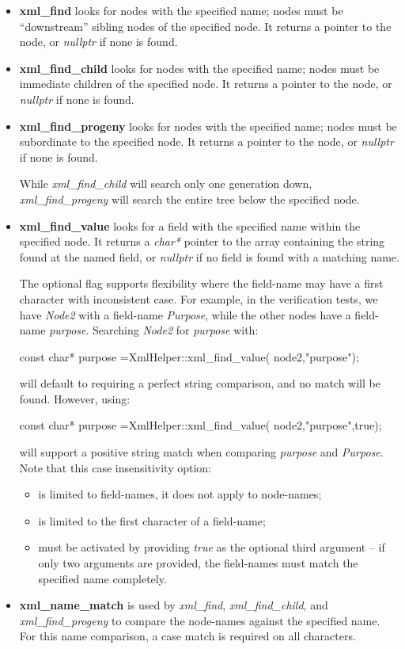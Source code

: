 \documentclass[11pt,fleqn]{report}
\begin{document}
\begin{itemize}
\item \textbf{xml\_find} looks for nodes with the specified name; nodes must
be ``downstream'' sibling nodes of the specified node.
It returns a pointer to the node, or \textit{nullptr} if none is found.
\item \textbf{xml\_find\_child} looks for nodes with the specified name;
nodes must be immediate children of the specified node.
It returns a pointer to the node, or \textit{nullptr} if none is found.
\item \textbf{xml\_find\_progeny} looks for nodes with the specified name;
nodes must be subordinate to the specified node.
It returns a pointer to the node, or \textit{nullptr} if none is found.

While \textit{xml\_find\_child} will search only one generation down,
\textit{xml\_find\_progeny} will search the entire tree below the specified
node.

\item \textbf{xml\_find\_value} looks for a field with the specified name
within the specified node. It returns a \textit{char*} pointer to the array
containing the string found at the named field, or \textit{nullptr} if no
field is found with a matching name.

The optional flag supports flexibility where the field-name may have a first
character with inconsistent case. For example, in the verification tests, we
have \textit{Node2} with a field-name \textit{Purpose}, while the other nodes
have a field-name \textit{purpose}. Searching \textit{Node2} for
\textit{purpose} with:
\begin{codeC}
const char* purpose =XmlHelper::xml_find_value( node2,"purpose");
\end{codeC}
will default to requiring a perfect string comparison, and no match will be
found. However, using:
\begin{codeC}
const char* purpose =XmlHelper::xml_find_value( node2,"purpose",true);
\end{codeC}
will support a positive string match when comparing \textit{purpose} and
\textit{Purpose}. Note that this case insensitivity option:
\begin{itemize}
\item is limited to field-names, it does not apply to node-names;
\item is limited to the first character of a field-name;
\item must be activated by providing \textit{true} as the optional third
argument -- if only two arguments are provided, the field-names must match
the specified name completely.
\end{itemize}

\item \textbf{xml\_name\_match} is used by \textit{xml\_find},
\textit{xml\_find\_child}, and \textit{xml\_find\_progeny} to compare the
node-names against the specified name. For this name comparison, a case
match is required on all characters.
\end{itemize}
\end{document}
